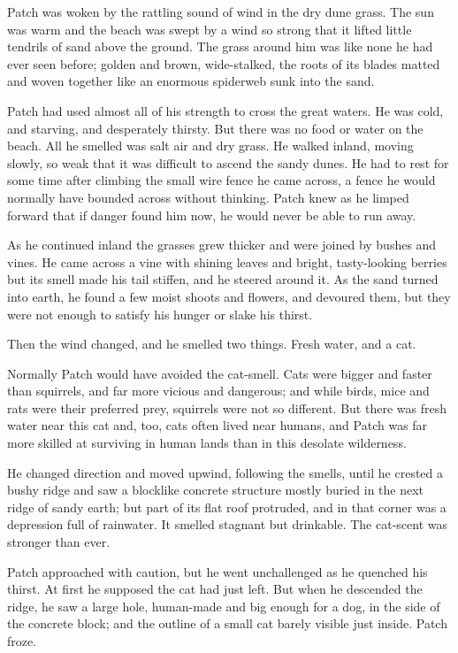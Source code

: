 \documentclass[12pt]{book}
\begin{document}
 Patch was woken by the rattling sound of wind in the dry dune grass. The sun was warm and the beach was swept by a wind so strong that it lifted little tendrils of sand above the ground. The grass around him was like none he had ever seen before; golden and brown, wide-stalked, the roots of its blades matted and woven together like an enormous spiderweb sunk into the sand.\par
 Patch had used almost all of his strength to cross the great waters. He was cold, and starving, and desperately thirsty. But there was no food or water on the beach. All he smelled was salt air and dry grass. He walked inland, moving slowly, so weak that it was difficult to ascend the sandy dunes. He had to rest for some time after climbing the small wire fence he came across, a fence he would normally have bounded across without thinking. Patch knew as he limped forward that if danger found him now, he would never be able to run away.\par
 As he continued inland the grasses grew thicker and were joined by bushes and vines. He came across a vine with shining leaves and bright, tasty-looking berries %
 but its smell made his tail stiffen, and he steered around it. As the sand turned into earth, he found a few moist shoots and flowers, and devoured them, but they were not enough to satisfy his hunger or slake his thirst.\par
 Then the wind changed, and he smelled two things. Fresh water, and a cat.\par
 Normally Patch would have avoided the cat-smell. Cats were bigger and faster than squirrels, and far more vicious and dangerous; and while birds, mice and rats were their preferred prey, squirrels were not so different. But there was fresh water near this cat %
 and, too, cats often lived near humans, and Patch was far more skilled at surviving in human lands than in this desolate wilderness.\par
 He changed direction and moved upwind, following the smells, until he crested a bushy ridge and saw a blocklike concrete structure mostly buried in the next ridge of sandy earth; but part of its flat roof protruded, and in that corner was a depression full of rainwater. It smelled stagnant but drinkable. The cat-scent was stronger than ever.\par
Patch approached with caution, but he went unchallenged as he quenched his thirst. At first he supposed the cat had just left. But when he descended the ridge, he saw a large hole, human-made and big enough for a dog, in the side of the concrete block; and the outline of a small cat barely visible just inside. Patch froze.\par
\end{document}
